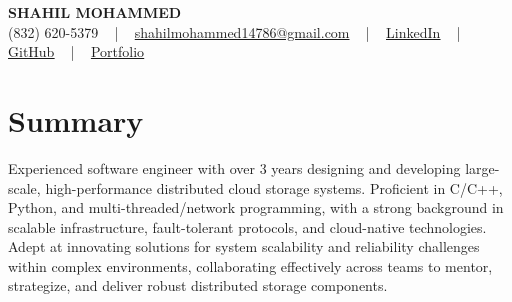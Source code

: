 \documentclass[letterpaper,10pt]{article}
\begin{document}
\begin{center}
    {\fontsize{14pt}{12pt}\selectfont \textbf{\MakeUppercase{Shahil Mohammed}}}\\ \vspace{2pt}
    \fontsize{10pt}{12pt}\selectfont (832) 620-5379 ~ | ~ \href{mailto:shahilmohammed14786@gmail.com}{shahilmohammed14786@gmail.com} ~ | ~  
    \href{https://www.linkedin.com/in/shahil-mohammed-9652931a1/}{\color{blue}\underline{LinkedIn}}  ~ | ~ 
    \href{https://github.com/freakbeast14}{\color{blue}\underline{GitHub}} ~ | ~ 
    \href{https://shahil-mohammed.netlify.app/}{\color{blue}\underline{Portfolio}}
    \vspace{-8pt}
\end{center}

\section{Summary}
\vspace{-2pt}\fontsize{8pt}{9pt}\selectfont
Experienced software engineer with over 3 years designing and developing large-scale, high-performance distributed cloud storage systems. Proficient in C/C++, Python, and multi-threaded/network programming, with a strong background in scalable infrastructure, fault-tolerant protocols, and cloud-native technologies. Adept at innovating solutions for system scalability and reliability challenges within complex environments, collaborating effectively across teams to mentor, strategize, and deliver robust distributed storage components.
 \vspace{-5pt}
 
\vspace{-2pt}
\end{document}
